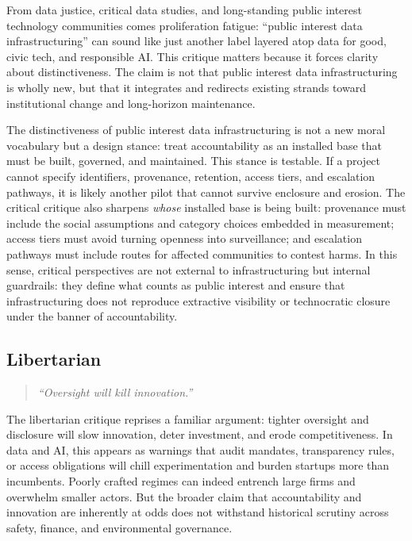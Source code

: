 \documentclass[acmsmall,screen]{acmart}
\begin{document}
\noindent From data justice, critical data studies, and long-standing public interest technology communities comes proliferation fatigue: ``public interest data infrastructuring'' can sound like just another label layered atop data for good, civic tech, and responsible AI. This critique matters because it forces clarity about distinctiveness. The claim is not that public interest data infrastructuring is wholly new, but that it integrates and redirects existing strands toward institutional change and long-horizon maintenance.

The distinctiveness of public interest data infrastructuring is not a new moral vocabulary but a design stance: treat accountability as an installed base that must be built, governed, and maintained. This stance is testable. If a project cannot specify identifiers, provenance, retention, access tiers, and escalation pathways, it is likely another pilot that cannot survive enclosure and erosion. The critical critique also sharpens \emph{whose} installed base is being built: provenance must include the social assumptions and category choices embedded in measurement; access tiers must avoid turning openness into surveillance; and escalation pathways must include routes for affected communities to contest harms. In this sense, critical perspectives are not external to infrastructuring but internal guardrails: they define what counts as public interest and ensure that infrastructuring does not reproduce extractive visibility or technocratic closure under the banner of accountability.

\subsection*{Libertarian}
\begin{quote}\centering
\textit{``Oversight will kill innovation.''}
\end{quote}

\noindent The libertarian critique reprises a familiar argument: tighter oversight and disclosure will slow innovation, deter investment, and erode competitiveness. In data and AI, this appears as warnings that audit mandates, transparency rules, or access obligations will chill experimentation and burden startups more than incumbents. Poorly crafted regimes can indeed entrench large firms and overwhelm smaller actors. But the broader claim that accountability and innovation are inherently at odds does not withstand historical scrutiny across safety, finance, and environmental governance.
\end{document}
